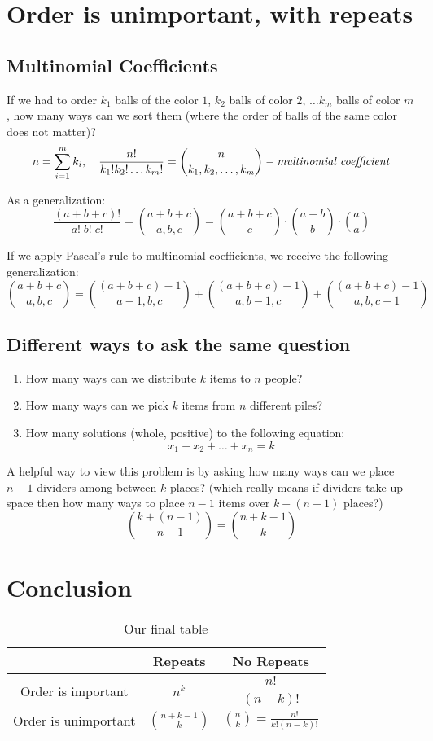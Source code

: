 \documentclass[00_complete]{subfiles}
\begin{document}
\section{Order is unimportant, with repeats}

\subsection{Multinomial Coefficients}

If we had to order $k_1$ balls of the color $1$, $k_2$ balls of color $2$,
$\dots k_m$ balls of color $m$, how many ways can we sort them (where the order
of balls of the same color does not matter)?
$$
    n = \sum_{i=1}^m k_i, \quad \frac{n!}{k_1!k_2!\dots k_m!}
    = \binom{n}{k_1,k_2,\dots,k_m} -
    \text{\emph{multinomial coefficient}}
$$

As a generalization:
$$\frac{(a+b+c)!}{a!\;b!\;c!} =\binom{a+b+c}{a,b,c} = \binom{a+b+c}{c}\cdot\binom{a+b}{b}\cdot\binom{a}{a}$$

If we apply Pascal's rule to multinomial coefficients, we receive the following
generalization:
$$\binom{a+b+c}{a,b,c} = \binom{(a+b+c)-1}{a-1,b,c}+\binom{(a+b+c)-1}{a,b-1,c}+\binom{(a+b+c)-1}{a,b,c-1}$$

\subsection{Different ways to ask the same question}

\begin{enumerate}
\item How many ways can we distribute $k$ items to $n$ people?
\item How many ways can we pick $k$ items from $n$ different piles?
\item How many solutions (whole, positive) to the following equation:
$$x_1+x_2+\dots+x_n=k$$
\end{enumerate}

A helpful way to view this problem is by asking how many ways can we place
$n-1$ dividers among between $k$ places? (which really means if dividers take
up space then how many ways to place $n-1$ items over $k + (n-1)$ places?)
$$\binom{k+(n-1)}{n-1} = \boxed{\binom{n+k-1}{k}}$$

\section{Conclusion}

\begin{table}[ht]
\centering
{\renewcommand{\arraystretch}{1.2}%
\begin{tabular}{ccc}
 \hline
& Repeats & No Repeats \\
 \hline
 Order is important & $n^k$ & $\dfrac{n!}{(n-k)!}$ \\
 Order is unimportant & $\displaystyle\binom{n+k-1}{k}$ & $\displaystyle\binom{n}{k}=\frac{n!}{k!(n-k)!}$ \\
 \hline
\end{tabular}}
\caption{Our final table}
\end{table}
\end{document}

